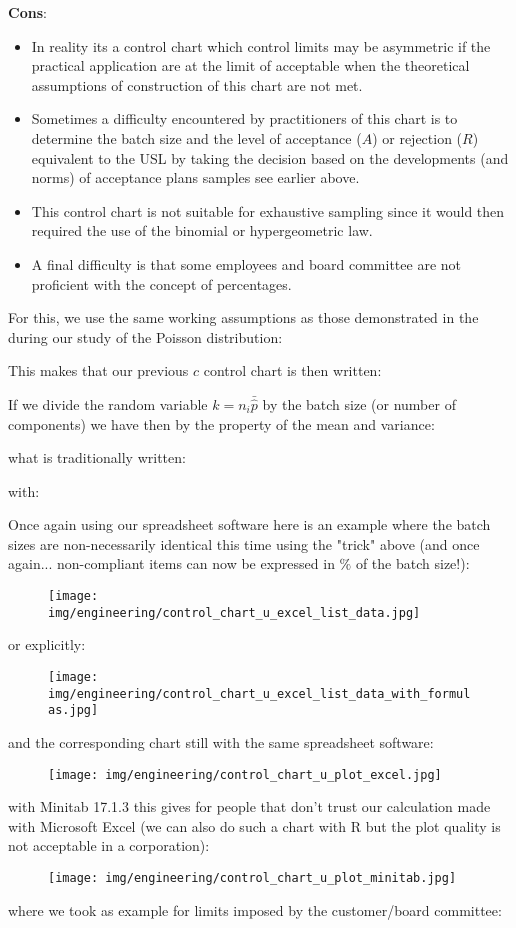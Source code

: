 	\textbf{Cons}:
	\begin{itemize}
		\item In reality its a control chart which control limits may be asymmetric if the practical application are at the limit of acceptable when the theoretical assumptions of construction of this chart are not met. 
		
		\item Sometimes a difficulty encountered by practitioners of this chart is to determine the batch size and the level of acceptance ($A$) or rejection ($R$) equivalent to the USL by taking the decision based on the developments (and norms) of acceptance plans samples see earlier above. 
		
		 \item This control chart is not suitable for exhaustive sampling since it would then required the use of the binomial or hypergeometric law.
		
		\item A final difficulty is that some employees and board committee are not proficient with the concept of percentages.
 	\end{itemize}
 	For this, we use the same working assumptions as those demonstrated in the during our study of the Poisson distribution:
	
	This makes that our previous $c$ control chart is then written:
	
	If we divide the random variable $k=n_i\bar{\hat{p}}$ by the batch size (or number of components) we have then by the property of the mean and variance:
	
	what is traditionally written:
	
	with:
	
	
	Once again using our spreadsheet software here is an example where the batch sizes are non-necessarily identical this time using the "trick" above (and once again... non-compliant items can now be expressed in $\%$ of the batch size!):
	\begin{figure}[H]
		\centering
		\texttt{[image: img/engineering/control\_chart\_u\_excel\_list\_data.jpg]}
	\end{figure}
	or explicitly:
	\begin{figure}[H]
		\centering
		\texttt{[image: img/engineering/control\_chart\_u\_excel\_list\_data\_with\_formulas.jpg]}
	\end{figure}
	and the corresponding chart still with the same spreadsheet software:
	\begin{figure}[H]
		\centering
		\texttt{[image: img/engineering/control\_chart\_u\_plot\_excel.jpg]}
	\end{figure}
	with Minitab 17.1.3 this gives for people that don't trust our calculation made with Microsoft Excel (we can also do such a chart with R but the plot quality is not acceptable in a corporation):	
	\begin{figure}[H]
		\centering
		\texttt{[image: img/engineering/control\_chart\_u\_plot\_minitab.jpg]}
	\end{figure}
	where we took as example for limits imposed by the customer/board committee:
	


